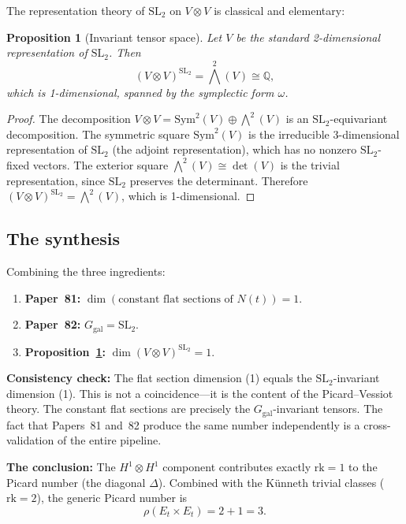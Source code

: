 \documentclass[11pt]{article}
\theoremstyle{plain}
\newtheorem{proposition}[theorem]{Proposition}
\theoremstyle{definition}
\theoremstyle{remark}
\newcommand{\Q}{\mathbb{Q}}
\newcommand{\SL}{\mathrm{SL}}
\newcommand{\rk}{\mathrm{rk}}
\newcommand{\Sym}{\mathrm{Sym}}
\newcommand{\Ggal}{G_{\mathrm{gal}}}
\begin{document}
The representation theory of $\SL_2$ on $V \otimes V$ is classical and elementary:

\begin{proposition}[Invariant tensor space]\label{prop:reptheory}
Let $V$ be the standard 2-dimensional representation of $\SL_2$.
Then
\[
  (V \otimes V)^{\SL_2} = \textstyle\bigwedge^2(V) \cong \Q,
\]
which is 1-dimensional, spanned by the symplectic form $\omega$.
\end{proposition}

\begin{proof}
The decomposition $V \otimes V = \Sym^2(V) \oplus \bigwedge^2(V)$ is an $\SL_2$-equivariant decomposition.
The symmetric square $\Sym^2(V)$ is the irreducible 3-dimensional representation of $\SL_2$ (the adjoint representation), which has no nonzero $\SL_2$-fixed vectors.
The exterior square $\bigwedge^2(V) \cong \det(V)$ is the trivial representation, since $\SL_2$ preserves the determinant.
Therefore $(V \otimes V)^{\SL_2} = \bigwedge^2(V)$, which is 1-dimensional.
\end{proof}

\subsection{The synthesis}

Combining the three ingredients:

\begin{enumerate}
  \item \textbf{Paper~81:} $\dim(\text{constant flat sections of } N(t)) = 1$.
  \item \textbf{Paper~82:} $\Ggal = \SL_2$.
  \item \textbf{Proposition~\ref{prop:reptheory}:} $\dim(V \otimes V)^{\SL_2} = 1$.
\end{enumerate}

\noindent
\textbf{Consistency check:} The flat section dimension (1) equals the $\SL_2$-invariant dimension (1).
This is not a coincidence---it is the content of the Picard--Vessiot theory.
The constant flat sections are precisely the $\Ggal$-invariant tensors.
The fact that Papers~81 and~82 produce the same number independently is a cross-validation of the entire pipeline.

\textbf{The conclusion:} The $H^1 \otimes H^1$ component contributes exactly $\rk = 1$ to the Picard number (the diagonal $\Delta$).
Combined with the K\"unneth trivial classes ($\rk = 2$), the generic Picard number is
\[
  \rho(E_t \times E_t) = 2 + 1 = 3.
\]
\end{document}
